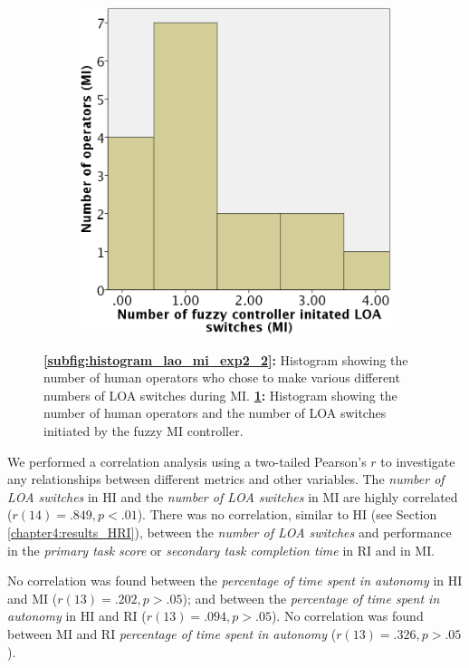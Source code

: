 \documentclass[a4paper,12pt,oneside,openright]{bhamthesis}
\begin{document}
\begin{figure}
\begin{subfigure}[b]{0.45\textwidth}
			\includegraphics[width=\textwidth]{chapter5_fig/histogram_loa_mi_ai_exp2_2.png}
			\caption{}
			\label{subfig:histogram_lao_mi_ai_exp2_2}
		\end{subfigure}
		\hfill
		\caption{\textbf{\ref{subfig:histogram_lao_mi_exp2_2}:} Histogram showing the number of human operators who chose to make various different numbers of LOA switches during MI. \textbf{\ref{subfig:histogram_lao_mi_ai_exp2_2}:} Histogram showing the number of human operators and the number of LOA switches initiated by the fuzzy MI controller.}
		\label{fig:histograms_mi_exp2_2}
	\end{figure}

We performed a correlation analysis using a two-tailed Pearson's $r$ to investigate any relationships between different metrics and other variables. The \textit{number of LOA switches} in HI and the \textit{number of LOA switches} in MI are highly correlated ($r(14)= .849, p<.01 $). There was no correlation, similar to HI (see Section \ref{chapter4:results_HRI}), between the \textit{number of LOA switches} and performance in the \textit{primary task score} or \textit{secondary task completion time} in RI and in MI.

No correlation was found between the \textit{percentage of time spent in autonomy} in HI and MI ($r(13)= .202, p>.05$); and between the \textit{percentage of time spent in autonomy} in HI and RI ($r(13)= .094, p>.05$). No correlation was found between MI and RI \textit{percentage of time spent in autonomy} ($r(13)= .326, p>.05$).
\end{document}
